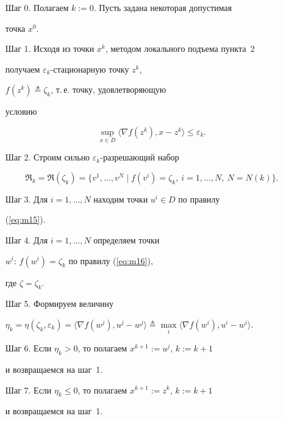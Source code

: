 \begin{itemize}


\begin{itemize}


\item[Шаг 0.] Полагаем $k:=0$. Пусть задана некоторая допустимая


точка $x^{0}$.


\item[Шаг 1.] Исходя из точки $x^{k}$, методом локального подъема пункта~2


получаем $\varepsilon_{k}$-ста\-ци\-о\-нар\-ную точку $z^{k}$,


$f(z^{k})\triangleq\zeta_{k}$, т.\,е. точку, удовлетворяющую


условию


$$


\sup_{x\in D} \langle \nabla f(z^k),x-z^k \rangle \leq \varepsilon_k .


$$ 


\item[Шаг 2.] Строим сильно $\varepsilon_k$-разрешающий набор


$$


\Re_{k}=\Re(\zeta_k)=\{ v^{1},\dotsc ,v^{N}\mid


f(v^{i})=\zeta_{k},\ i=1,\dotsc,N,\ N=N(k) \}.


$$


\item[Шаг 3.] Для $ i=1,\dotsc,N$ находим точки $u^{i} \in D $ по правилу


(\ref{eq:m15}).


\item[Шаг 4.] Для $i=1,\dotsc ,N$ определяем точки 


$w^{i}: \, f(w^{i})=\zeta_{k} $ по правилу (\ref{eq:m16}), 


где $\zeta = \zeta_{k}$.


\item[Шаг 5.] Формируем величину


$\eta_{k}=\eta(\zeta_{k},\varepsilon_{k})=


\langle \nabla f(w^{j}),u^{j}-w^{j} \rangle \triangleq


\max\limits_{i} \langle \nabla f(w^{i}),u^{i}-w^{i} \rangle$. 


\item[Шаг 6.] Если $\eta_{k}>0$, то полагаем $x^{k+1}:=u^{j}$, $k:=k+1$


и возвращаемся на шаг~1.


\item[Шаг 7.] Если $\eta_{k} \leq 0$, то полагаем $x^{k+1}:=z^{k}$, $k:=k+1$


и возвращаемся на шаг~1.


\end{itemize}


\end{itemize}





